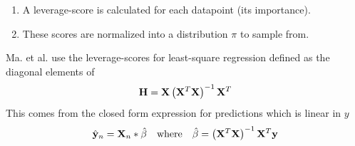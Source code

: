 \documentclass{article}
\begin{document}
\begin{enumerate}
\item A leverage-score is calculated for each datapoint (its importance).
\item These scores are normalized into a distribution $\pi$ to sample from.
\end{enumerate}

Ma. et al. \cite{Ma} use the leverage-scores for least-square regression defined as the diagonal elements of
\begin{equation}
{\bf H} = {\bf X} \left( {\bf X}^T {\bf X} \right)^{-1} {\bf X}^T
 \label{eq:hdist}
\end{equation}
This comes from the closed form expression for predictions which is linear in $y$
\begin{equation*}
	\hat{{\bf y}}_n = {\bf X}_n*\hat{\beta} \quad \text{where} \quad \hat{\beta} = \left( {\bf X}^T {\bf X} \right)^{-1} {\bf X}^T {\bf y} 
\end{equation*}
\end{document}
